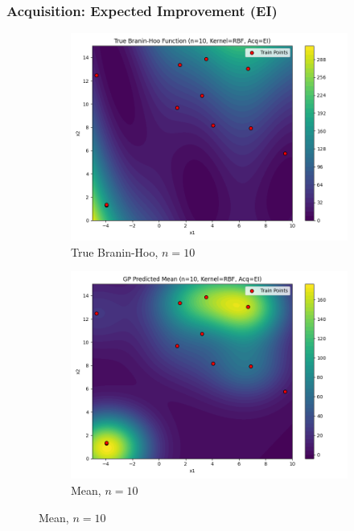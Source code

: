 \documentclass[a4paper,12pt]{article}
\begin{document}
\subsubsection*{Acquisition: Expected Improvement (EI)}
\begin{figure}[H]
\centering
\begin{subfigure}{0.3\textwidth}
  \includegraphics[width=\linewidth]{Task-02/images/true_function_rbf_n10_EI.png}
  \caption{True Branin-Hoo, $n=10$}
\end{subfigure}
\begin{subfigure}{0.3\textwidth}
    \includegraphics[width=\linewidth]{Task-02/images/gp_mean_rbf_n10_EI.png}
    \caption{Mean, $n=10$}
\end{subfigure}

\end{figure}
\end{document}
